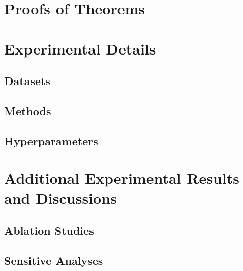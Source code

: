\section{Proofs of Theorems}\label{app:proofs}

\section{Experimental Details}\label{app:setup}

\subsection{Datasets}\label{app:setup:datasets}

\subsection{Methods}\label{app:setup:methods}

\subsection{Hyperparameters}\label{app:setup:hyperparameters}

\section{%
    Additional Experimental Results and Discussions
}\label{app:results}

\subsection{Ablation Studies}\label{app:results:ablation}

\subsection{Sensitive Analyses}\label{app:results:sensitive}
